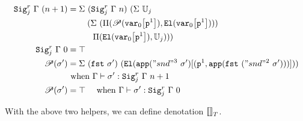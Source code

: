 \begin{align*}
  {\Sigr{\Gamma}{(n+1)}{j}} &= 
    \Sigma~(\Sigr{\Gamma}{n}{j})
          ~(\Sigma~\cU_j \\
          & \quad \quad ~(\Sigma~(\TyPi{{\mathscr{P}({\sub{\var{0}}{\SubstWeak{1}}})}}{\El{\sub{\var{0}}{\SubstWeak{1}}}}) \\
          & \quad \quad \quad \TyPi{\El{\sub{\var{0}}{\SubstWeak{1}}}}{\cU_j})) \\
  \Sigr{\Gamma}{0}{j} &= \top \\
  \mathscr{P}(\lsig') &=  
    \Sigma~(\fst{\lsig'})~(\El{\app{"snd"^3~\lsig'}[(\SubstWeak{1}, \app{\fst{("snd"^2~{\lsig'})}})]}) \\ & \text{ when } \goodTerm{\Gm}{\lsig'}{\Sigr{\Gm}{n+1}{j}} \\
  \mathscr{P}(\lsig') &=  \top \quad \text{ when } \goodTerm{\Gm}{\lsig'}{\Sigr{\Gm}{0}{j}}  \\
\end{align*}



With the above two helpers, we can define denotation $\denotesT{}$.

